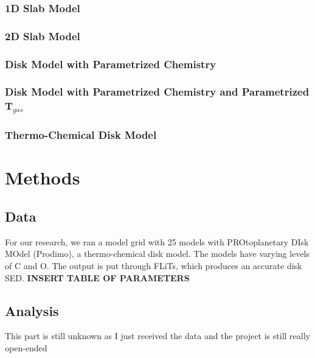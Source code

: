 \documentclass[twoside,single]{lion-msc}
\begin{document}
\subsection{1D Slab Model}
\subsection{2D Slab Model}
\subsection{Disk Model with Parametrized Chemistry}
\subsection{Disk Model with Parametrized Chemistry and Parametrized T$_{gas}$}
\subsection{Thermo-Chemical Disk Model}

\chapter{Methods}
\section{Data}
For our research, we ran a model grid with 25 models with PROtoplanetary DIsk MOdel (Prodimo), a thermo-chemical disk model. The models have varying levels of C and O. The output is put through FLiTs, which produces an accurate disk SED. 
\textbf{INSERT TABLE OF PARAMETERS}
\section{Analysis}
This part is still unknown as I just received the data and the project is still really open-ended 



\end{document}
